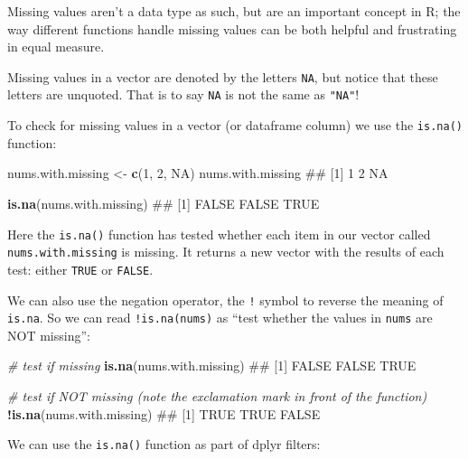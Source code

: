 \documentclass[]{article}
\newenvironment{Shaded}{\begin{snugshade}}{\end{snugshade}}
\newcommand{\KeywordTok}[1]{\textcolor[rgb]{0.13,0.29,0.53}{\textbf{#1}}}
\newcommand{\DecValTok}[1]{\textcolor[rgb]{0.00,0.00,0.81}{#1}}
\newcommand{\StringTok}[1]{\textcolor[rgb]{0.31,0.60,0.02}{#1}}
\newcommand{\CommentTok}[1]{\textcolor[rgb]{0.56,0.35,0.01}{\textit{#1}}}
\newcommand{\OtherTok}[1]{\textcolor[rgb]{0.56,0.35,0.01}{#1}}
\newcommand{\OperatorTok}[1]{\textcolor[rgb]{0.81,0.36,0.00}{\textbf{#1}}}
\newcommand{\NormalTok}[1]{#1}
\theoremstyle{definition}
\theoremstyle{definition}
\theoremstyle{definition}
\theoremstyle{remark}
\begin{document}
Missing values aren't a data type as such, but are an important concept
in R; the way different functions handle missing values can be both
helpful and frustrating in equal measure.

Missing values in a vector are denoted by the letters \texttt{NA}, but
notice that these letters are unquoted. That is to say \texttt{NA} is
not the same as \texttt{"NA"}!

To check for missing values in a vector (or dataframe column) we use the
\texttt{is.na()} function:

\begin{Shaded}
\begin{Highlighting}[]
\NormalTok{nums.with.missing <-}\StringTok{ }\KeywordTok{c}\NormalTok{(}\DecValTok{1}\NormalTok{, }\DecValTok{2}\NormalTok{, }\OtherTok{NA}\NormalTok{)}
\NormalTok{nums.with.missing}
\NormalTok{## [1]  1  2 NA}

\KeywordTok{is.na}\NormalTok{(nums.with.missing)}
\NormalTok{## [1] FALSE FALSE  TRUE}
\end{Highlighting}
\end{Shaded}

Here the \texttt{is.na()} function has tested whether each item in our
vector called \texttt{nums.with.missing} is missing. It returns a new
vector with the results of each test: either \texttt{TRUE} or
\texttt{FALSE}.

We can also use the negation operator, the \texttt{!} symbol to reverse
the meaning of \texttt{is.na}. So we can read \texttt{!is.na(nums)} as
``test whether the values in \texttt{nums} are NOT missing'':

\begin{Shaded}
\begin{Highlighting}[]
\CommentTok{# test if missing}
\KeywordTok{is.na}\NormalTok{(nums.with.missing)}
\NormalTok{## [1] FALSE FALSE  TRUE}

\CommentTok{# test if NOT missing (note the exclamation mark in front of the function)}
\OperatorTok{!}\KeywordTok{is.na}\NormalTok{(nums.with.missing)}
\NormalTok{## [1]  TRUE  TRUE FALSE}
\end{Highlighting}
\end{Shaded}

We can use the \texttt{is.na()} function as part of dplyr filters:

\begin{Shaded}
\end{Shaded}
\end{document}
